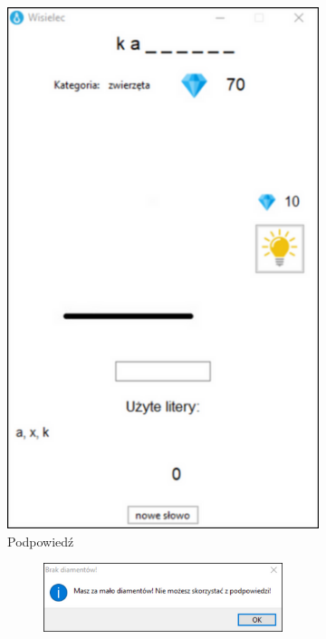 \documentclass[]{report}
\begin{document}
\begin{figure}[h]
	\centering
	\begin{subfigure}{0.4\textwidth}
		\centering
		\includegraphics[width=\linewidth]{7}
		\caption{Podpowiedź}
		\label{fig:podpowiedz}
		\vspace{0.5cm} %
	\end{subfigure}
	\begin{subfigure}{0.4\textwidth}
		\begin{subfigure}{0.4\textheight}
			\centering
			\includegraphics[width=0.8\linewidth]{brak_diamentow}

\end{subfigure}
\end{subfigure}
\end{figure}
\end{document}
